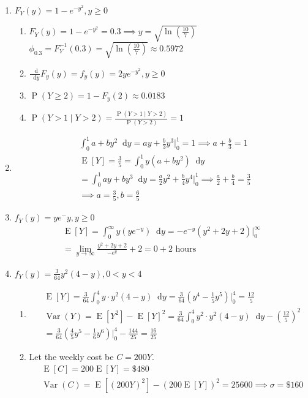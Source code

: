 \documentclass{article}
\newcommand{\pr}[1]{\operatorname{P}\left(#1\right)}
\newcommand{\var}[1]{\operatorname{Var}(#1)}
\newcommand{\expt}[1]{\operatorname{E}[#1]}
\newcommand*\diff{\mathop{}\!\mathrm{d}}
\newcommand{\drv}[3]{\frac{\diff#1^{#3}}{\diff#2^{#3}}}
\newcommand{\intv}[4]{\int_{#3}^{#4} #1 \diff #2}
\begin{document}
\begin{enumerate}
  \item $F_Y(y) = 1-e^{-y^2}, y\geq 0$ 
  \begin{enumerate}
    \item $F_Y(y) = 1-e^{-y^2} = 0.3 \implies y = \sqrt{\ln\left(\frac{10}{7}\right)}$\\ 
    $\phi_{0.3} = F_Y^{-1}(0.3) = \sqrt{\ln\left(\frac{10}{7}\right)} \approx 0.5972$

    \item $\drv{}{y}{}F_y(y) = f_y(y) = 2ye^{-y^2}, y\geq 0$
    \item $\pr{Y\geq 2} = 1 - F_y(2) \approx 0.0183$
    \item $\pr{Y > 1 \mid Y > 2} = \frac{\pr{Y > 1 \mid Y > 2}}{\pr{Y > 2}} = 1$
  \end{enumerate}

  \item \begin{align*}
    & \intv{a+by^2}{y}{0}{1} = ay + \frac{b}{3}y^3\bigg\rvert_0^1 = 1 \implies a+\frac{b}{3} = 1\\
    & \expt{Y} = \frac{3}{5} = \intv{y(a+by^2)}{y}{0}{1}\\
    & =\intv{ay+by^3}{y}{0}{1} 
    = \frac{a}{2}y^2 + \frac{b}{4}y^4\bigg\rvert_0^1 
    \implies \frac{a}{2} + \frac{b}{4} = \frac{3}{5}\\
    & \implies a = \frac{3}{5}, b = \frac{6}{5}
  \end{align*}

  \item $f_Y(y) = ye{^-y}, y \geq 0$ 
  \begin{align*}
    \expt{Y} = \intv{y(ye^{-y})}{y}{0}{\infty} = -e^{-y}\left(y^{2} + 2y + 2\right)\bigg\rvert_0^\infty\\
    = \lim\limits_{y\to\infty}\frac{y^{2} + 2y + 2}{-e^{y}} + 2 = 0 + 2\text{ hours}
  \end{align*}

  \item $f_Y(y) = \frac{3}{64}y^2(4-y), 0 < y < 4$ 
  \begin{enumerate}
    \item \begin{align*}
      & \expt{Y} = \frac{3}{64}\intv{y\cdot y^2(4-y)}{y}{0}{4} = 
      \frac{3}{64}(y^4-\frac{1}{5}y^5)\bigg\rvert_0^4 = \frac{12}{5}\\
      & \var{Y} = \expt{Y^2} - \expt{Y}^2 = 
      \frac{3}{64}\intv{y^2\cdot y^2(4-y)}{y}{0}{4} - \left(\frac{12}{5}\right)^2\\
      & = \frac{3}{64}\left(\frac{4}{5}y^5 - \frac{1}{6}y^6\right)
      \bigg\rvert_0^4 - \frac{144}{25} = \frac{16}{25} 
    \end{align*}
    \item Let the weekly cost be $C = 200Y$.
    \begin{align*}
      & \expt{C} = 200\expt{Y} = \$480\\
      & \var{C} =  \expt{(200Y)^2} -  (200\expt{Y})^2 = 25600 \implies \sigma = \$160
    \end{align*}
    

\end{enumerate}
\end{enumerate}
\end{document}
